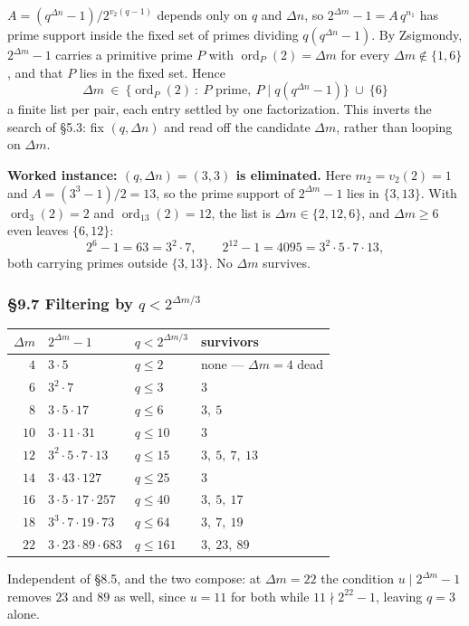 \documentclass[11pt]{article}
\begin{document}
$A = \left(q^{\Delta n}-1\right)/2^{v_2(q-1)}$ depends only on $q$ and $\Delta n$, so $2^{\Delta m}-1 = A\,q^{n_1}$ has prime support inside the fixed set of primes dividing $q\left(q^{\Delta n}-1\right)$. By Zsigmondy, $2^{\Delta m}-1$ carries a primitive prime $P$ with $\operatorname{ord}_P(2) = \Delta m$ for every $\Delta m \notin \{1,6\}$, and that $P$ lies in the fixed set. Hence
\[
\boxed{\ \Delta m \ \in\ \big\{\operatorname{ord}_P(2)\ :\ P \text{ prime},\ P \mid q\left(q^{\Delta n}-1\right)\big\}\ \cup\ \{6\}\ }
\]
a finite list per pair, each entry settled by one factorization. This inverts the search of \S5.3: fix $(q,\Delta n)$ and read off the candidate $\Delta m$, rather than looping on $\Delta m$.

\medskip
\noindent\textbf{Worked instance: $(q,\Delta n) = (3,3)$ is eliminated.} Here $m_2 = v_2(2) = 1$ and $A = \left(3^{3}-1\right)/2 = 13$, so the prime support of $2^{\Delta m}-1$ lies in $\{3,13\}$. With $\operatorname{ord}_3(2) = 2$ and $\operatorname{ord}_{13}(2) = 12$, the list is $\Delta m \in \{2,12,6\}$, and $\Delta m \geq 6$ even leaves $\{6,12\}$:
\[
2^{6}-1 = 63 = 3^{2}\cdot 7, \qquad 2^{12}-1 = 4095 = 3^{2}\cdot 5\cdot 7\cdot 13,
\]
both carrying primes outside $\{3,13\}$. No $\Delta m$ survives.

\subsubsection*{\S9.7 Filtering by $q < 2^{\Delta m/3}$}

\begin{center}
\begin{tabular}{rlll}
\hline
$\Delta m$ & $2^{\Delta m}-1$ & $q < 2^{\Delta m/3}$ & survivors \\
\hline
$4$ & $3\cdot 5$ & $q \leq 2$ & none --- $\Delta m = 4$ dead \\
$6$ & $3^{2}\cdot 7$ & $q \leq 3$ & $3$ \\
$8$ & $3\cdot 5\cdot 17$ & $q \leq 6$ & $3,\ 5$ \\
$10$ & $3\cdot 11\cdot 31$ & $q \leq 10$ & $3$ \\
$12$ & $3^{2}\cdot 5\cdot 7\cdot 13$ & $q \leq 15$ & $3,\ 5,\ 7,\ 13$ \\
$14$ & $3\cdot 43\cdot 127$ & $q \leq 25$ & $3$ \\
$16$ & $3\cdot 5\cdot 17\cdot 257$ & $q \leq 40$ & $3,\ 5,\ 17$ \\
$18$ & $3^{3}\cdot 7\cdot 19\cdot 73$ & $q \leq 64$ & $3,\ 7,\ 19$ \\
$22$ & $3\cdot 23\cdot 89\cdot 683$ & $q \leq 161$ & $3,\ 23,\ 89$ \\
\hline
\end{tabular}
\end{center}
Independent of \S8.5, and the two compose: at $\Delta m = 22$ the condition $u \mid 2^{\Delta m}-1$ removes $23$ and $89$ as well, since $u = 11$ for both while $11 \nmid 2^{22}-1$, leaving $q = 3$ alone.
\end{document}
